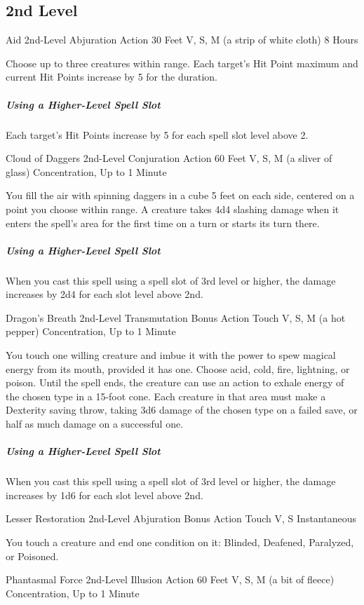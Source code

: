 \documentclass[letterpaper,openany,oneside,twocolumn]{book}
\begin{document}
\subsection*{2nd Level}

\DndSpellHeader
  {Aid}
  {2nd-Level Abjuration}
  {Action}
  {30 Feet}
  {V, S, M (a strip of white cloth)}
  {8 Hours}

Choose up to three creatures within range. Each target's Hit Point maximum and current Hit Points increase by 5 for the duration.

\subparagraph*{Using a Higher-Level Spell Slot} Each target's Hit Points increase by 5 for each spell slot level above 2.

\DndSpellHeader
  {Cloud of Daggers}
  {2nd-Level Conjuration}
  {Action}
  {60 Feet}
  {V, S, M (a sliver of glass)}
  {Concentration, Up to 1 Minute}

You fill the air with spinning daggers in a cube 5 feet on each side, centered on a point you choose within range. A creature takes 4d4 slashing damage when it enters the spell's area for the first time on a turn or starts its turn there.

\subparagraph*{Using a Higher-Level Spell Slot} When you cast this spell using a spell slot of 3rd level or higher, the damage increases by 2d4 for each slot level above 2nd.

\DndSpellHeader
  {Dragon's Breath}
  {2nd-Level Transmutation}
  {Bonus Action}
  {Touch}
  {V, S, M (a hot pepper)}
  {Concentration, Up to 1 Minute}

You touch one willing creature and imbue it with the power to spew magical energy from its mouth, provided it has one. Choose acid, cold, fire, lightning, or poison. Until the spell ends, the creature can use an action to exhale energy of the chosen type in a 15-foot cone. Each creature in that area must make a Dexterity saving throw, taking 3d6 damage of the chosen type on a failed save, or half as much damage on a successful one.

\subparagraph*{Using a Higher-Level Spell Slot} When you cast this spell using a spell slot of 3rd level or higher, the damage increases by 1d6 for each slot level above 2nd.

\DndSpellHeader
  {Lesser Restoration}
  {2nd-Level Abjuration}
  {Bonus Action}
  {Touch}
  {V, S}
  {Instantaneous}

You touch a creature and end one condition on it: Blinded, Deafened, Paralyzed, or Poisoned.

\DndSpellHeader
  {Phantasmal Force}
  {2nd-Level Illusion}
  {Action}
  {60 Feet}
  {V, S, M (a bit of fleece)}
  {Concentration, Up to 1 Minute}
\end{document}

